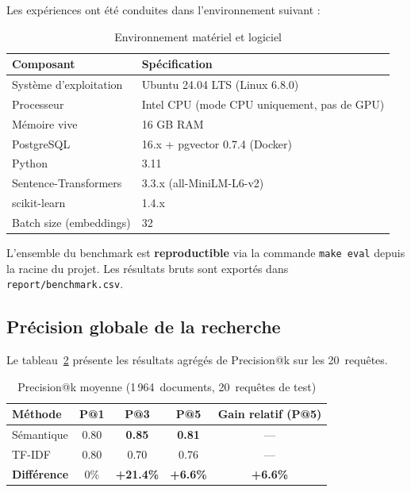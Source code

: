 \documentclass[12pt,a4paper]{article}
\begin{document}
Les exp\'{e}riences ont \'{e}t\'{e} conduites dans l'environnement suivant :

\begin{table}[H]
\centering
\caption{Environnement mat\'{e}riel et logiciel}
\label{tab:env}
\begin{tabular}{@{}ll@{}}
\toprule
\textbf{Composant} & \textbf{Sp\'{e}cification} \\
\midrule
Syst\`{e}me d'exploitation  & Ubuntu 24.04 LTS (Linux 6.8.0) \\
Processeur               & Intel CPU (mode CPU uniquement, pas de GPU) \\
M\'{e}moire vive             & 16 GB RAM \\
PostgreSQL               & 16.x + pgvector 0.7.4 (Docker) \\
Python                   & 3.11 \\
Sentence-Transformers    & 3.3.x (all-MiniLM-L6-v2) \\
scikit-learn             & 1.4.x \\
Batch size (embeddings)  & 32 \\
\bottomrule
\end{tabular}
\end{table}

L'ensemble du benchmark est \textbf{reproductible} via la commande \texttt{make eval} depuis la racine du projet. Les r\'{e}sultats bruts sont export\'{e}s dans \texttt{report/benchmark.csv}.

\subsection{Pr\'{e}cision globale de la recherche}

Le tableau~\ref{tab:precision} pr\'{e}sente les r\'{e}sultats agr\'{e}g\'{e}s de Precision@k sur les 20~requ\^{e}tes.

\begin{table}[H]
\centering
\caption{Precision@k moyenne (1\,964~documents, 20~requ\^{e}tes de test)}
\label{tab:precision}
\begin{tabular}{@{}lcccc@{}}
\toprule
\textbf{M\'{e}thode} & \textbf{P@1} & \textbf{P@3} & \textbf{P@5} & \textbf{Gain relatif (P@5)} \\
\midrule
S\'{e}mantique  & 0.80 & \textbf{0.85} & \textbf{0.81} & --- \\
TF-IDF      & 0.80 & 0.70 & 0.76 & --- \\
\midrule
\textbf{Diff\'{e}rence} & 0\% & \textbf{+21.4\%} & \textbf{+6.6\%} & \textbf{+6.6\%} \\
\bottomrule
\end{tabular}
\end{table}
\end{document}
